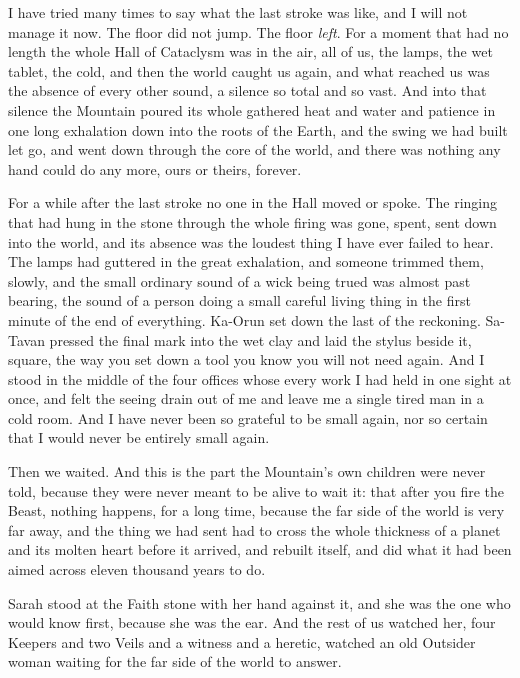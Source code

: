\ornament

I have tried many times to say what the last stroke was like, and I will not manage it now. The floor did not jump. The floor \emph{left}. For a moment that had no length the whole Hall of Cataclysm was in the air, all of us, the lamps, the wet tablet, the cold, and then the world caught us again, and what reached us was the absence of every other sound, a silence so total and so vast. And into that silence the Mountain poured its whole gathered heat and water and patience in one long exhalation down into the roots of the Earth, and the swing we had built let go, and went down through the core of the world, and there was nothing any hand could do any more, ours or theirs, forever.\par

For a while after the last stroke no one in the Hall moved or spoke. The ringing that had hung in the stone through the whole firing was gone, spent, sent down into the world, and its absence was the loudest thing I have ever failed to hear. The lamps had guttered in the great exhalation, and someone trimmed them, slowly, and the small ordinary sound of a wick being trued was almost past bearing, the sound of a person doing a small careful living thing in the first minute of the end of everything. Ka-Orun set down the last of the reckoning. Sa-Tavan pressed the final mark into the wet clay and laid the stylus beside it, square, the way you set down a tool you know you will not need again. And I stood in the middle of the four offices whose every work I had held in one sight at once, and felt the seeing drain out of me and leave me a single tired man in a cold room. And I have never been so grateful to be small again, nor so certain that I would never be entirely small again.\par

\ornament

Then we waited. And this is the part the Mountain's own children were never told, because they were never meant to be alive to wait it: that after you fire the Beast, nothing happens, for a long time, because the far side of the world is very far away, and the thing we had sent had to cross the whole thickness of a planet and its molten heart before it arrived, and rebuilt itself, and did what it had been aimed across eleven thousand years to do.\par

Sarah stood at the Faith stone with her hand against it, and she was the one who would know first, because she was the ear. And the rest of us watched her, four Keepers and two Veils and a witness and a heretic, watched an old Outsider woman waiting for the far side of the world to answer.\par

